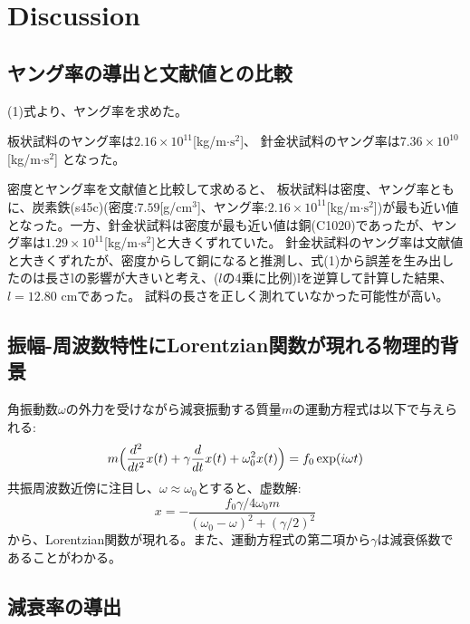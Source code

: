 \documentclass[a4paper,11pt]{jsarticle}
\begin{document}
\clearpage

\section{Discussion}
\subsection{ヤング率の導出と文献値との比較}
(1)式より、ヤング率を求めた。

板状試料のヤング率は$ 2.16 \times 10^{11}$[kg/m$\cdot \text{s}^2$]、
針金状試料のヤング率は$ 7.36 \times 10^{10}$[kg/m$\cdot \text{s}^2$]
となった。

密度とヤング率を文献値と比較して求めると、
板状試料は密度、ヤング率ともに、炭素鉄(s45c)(密度:$7.59$[g/$\text{cm}^3$]、ヤング率:$2.16\times 10^{11}$[kg/m$\cdot \text{s}^2$])が最も近い値となった。一方、針金状試料は密度が最も近い値は銅(C1020)であったが、ヤング率は$1.29\times 10^{11}$[kg/m$\cdot \text{s}^2$]と大きくずれていた。
針金状試料のヤング率は文献値と大きくずれたが、密度からして銅になると推測し、式(1)から誤差を生み出したのは長さlの影響が大きいと考え、($l$の4乗に比例)lを逆算して計算した結果、$l = 12.80$ cmであった。
試料の長さを正しく測れていなかった可能性が高い。

\subsection{振幅-周波数特性にLorentzian関数が現れる物理的背景}
角振動数$\omega$の外力を受けながら減衰振動する質量$m$の運動方程式は以下で与えられる:
\begin{equation}
  m\Bigl( \frac{d^2}{dt^2} x(t) + \gamma \frac{d}{dt}x(t) + \omega_0^2 x(t)\Bigr) = f_0 \exp(i\omega t)
\end{equation}
共振周波数近傍に注目し、$\omega \approx \omega_0$とすると、虚数解:
\begin{equation}
  x = -\frac{f_0 \gamma / 4\omega_0 m}{(\omega_0 - \omega)^2 + (\gamma /2)^2}
\end{equation}
から、Lorentzian関数が現れる。また、運動方程式の第二項から$\gamma$は減衰係数であることがわかる。
\subsection{減衰率の導出}
\end{document}
